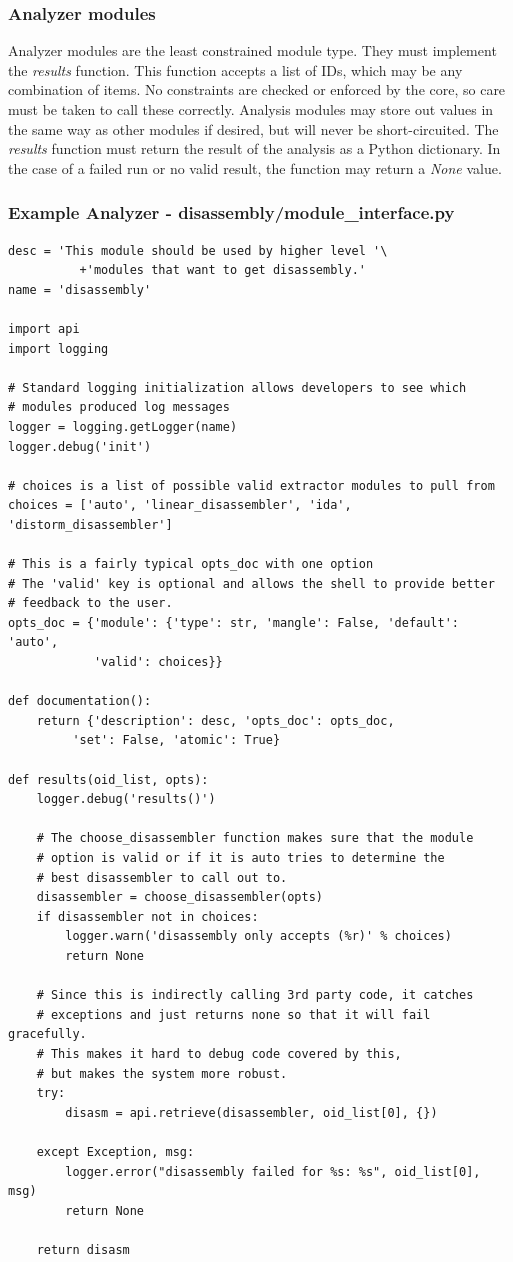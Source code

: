 \documentclass{book}
\begin{document}
\subsubsection{Analyzer modules}
Analyzer modules are the least constrained module type.  They must implement the \emph{results} function.  This function accepts a list of IDs, which may be any combination of items.  No constraints are checked or enforced by the core, so care must be taken to call these correctly.  Analysis modules may store out values in the same way as other modules if desired, but will never be short-circuited.  The \emph{results} function must return the result of the analysis as a Python dictionary.  In the case of a failed run or no valid result, the function may return a \emph{None} value.

\subsubsection{Example Analyzer - disassembly/module\_interface.py}
\begin{verbatim}
desc = 'This module should be used by higher level '\ 
          +'modules that want to get disassembly.'
name = 'disassembly'

import api
import logging

# Standard logging initialization allows developers to see which
# modules produced log messages
logger = logging.getLogger(name)
logger.debug('init')

# choices is a list of possible valid extractor modules to pull from
choices = ['auto', 'linear_disassembler', 'ida', 'distorm_disassembler']

# This is a fairly typical opts_doc with one option
# The 'valid' key is optional and allows the shell to provide better
# feedback to the user.
opts_doc = {'module': {'type': str, 'mangle': False, 'default': 'auto', 
            'valid': choices}}

def documentation():
    return {'description': desc, 'opts_doc': opts_doc, 
	     'set': False, 'atomic': True}

def results(oid_list, opts):
    logger.debug('results()')

    # The choose_disassembler function makes sure that the module
    # option is valid or if it is auto tries to determine the 
    # best disassembler to call out to.
    disassembler = choose_disassembler(opts)
    if disassembler not in choices:
        logger.warn('disassembly only accepts (%r)' % choices)
        return None

    # Since this is indirectly calling 3rd party code, it catches 
    # exceptions and just returns none so that it will fail gracefully.  
    # This makes it hard to debug code covered by this, 
    # but makes the system more robust.
    try:
        disasm = api.retrieve(disassembler, oid_list[0], {})

    except Exception, msg:
        logger.error("disassembly failed for %s: %s", oid_list[0], msg)
        return None

    return disasm
\end{verbatim}
\end{document}
